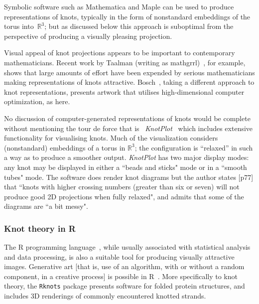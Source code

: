 \documentclass{birkjour}
\theoremstyle{definition}
\theoremstyle{remark}
\numberwithin{equation}{section}
\begin{document}
Symbolic software such as Mathematica and Maple can be used to produce
representations of knots, typically in the form of nonstandard
embeddings of the torus into~$\mathbb{R}^3$; but as discussed below
this approach is suboptimal from the perspective of producing a
visually pleasing projection.

Visual appeal of knot projections appears to be important to
contemporary mathematicians.  Recent work by Taalman (writing as
mathgrrl)~\cite{taalman2019}, for example, shows that large amounts of
effort have been expended by serious mathematicians making
representations of knots attractive.  Bosch~\cite{bosch2010}, taking a
different approach to knot representations, presents artwork that
utilises high-dimensional computer optimization, as here.

No discussion of computer-generated representations of knots would be
complete without mentioning the tour de force that is~{\em
  KnotPlot}~\cite{scharein1997,scharein1998} which includes extensive
functionality for visualising knots.  Much of the visualization
considers (nonstandard) embeddings of a torus in $\mathbb{R}^3$; the
configuration is ``relaxed'' in such a way as to produce a smoother
output.  {\em KnotPlot} has two major display modes: any knot may be
displayed in either a ``beads and sticks" mode or in a ``smooth tubes"
mode.  The software does render knot diagrams but the author states
[p77] that ``knots with higher crossing numbers (greater than six or
seven) will not produce good 2D projections when fully relaxed", and
admits that some of the diagrams are ``a bit messy".


\subsubsection{Knot theory in R}

The R programming language~\cite{rcore2021}, while usually associated
with statistical analysis and data processing, is also a suitable tool
for producing visually attractive images.  Generative art [that is,
  use of an algorithm, with or without a random component, in a
  creative process] is possible in R~\cite{brunner2021}.  More
specifically to knot theory, the {\tt Rknots}
package\cite{comoglio2011,comoglio2016} presents software for folded
protein structures, and includes 3D renderings of commonly encountered
knotted strands.
\end{document}
